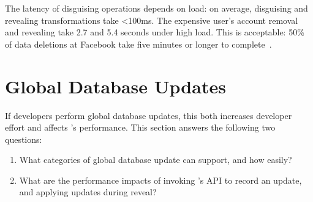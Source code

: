 %
%
%

The latency of disguising operations depends on load: on average, disguising and
revealing transformations take <100ms.  The expensive user's account removal and
revealing take 2.7 and 5.4 seconds under high load. 
%
%
This is acceptable: 50\% of data deletions at Facebook take five minutes or
longer to complete~\cite{delf}.
%

\section{Global Database Updates}
\label{s:eval-updates}

%
If developers perform global database updates, this both increases
developer effort and affects \sys's performance. This section answers the following
two questions:
\begin{enumerate}[nosep]
    \item What categories of global database update can \sys support, and how
        easily? 
    \item What are the performance impacts of invoking \sys's API to record an
        update, and applying updates during reveal?
\end{enumerate}


